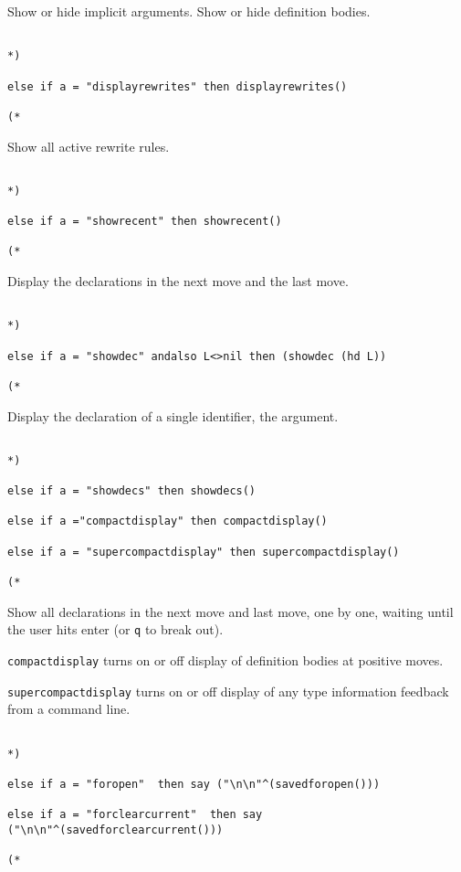 \documentclass{article}
\begin{document}
Show or hide implicit arguments.  Show or hide definition bodies.

\begin{verbatim}

*)

else if a = "displayrewrites" then displayrewrites()

(*

\end{verbatim}

Show all active rewrite rules.

\begin{verbatim}

*)

else if a = "showrecent" then showrecent()

(*

\end{verbatim}

Display the declarations in the next move and the last move.

\begin{verbatim}

*)

else if a = "showdec" andalso L<>nil then (showdec (hd L))

(*

\end{verbatim}

Display the declaration of a single identifier, the argument.

\begin{verbatim}

*)

else if a = "showdecs" then showdecs()

else if a ="compactdisplay" then compactdisplay()

else if a = "supercompactdisplay" then supercompactdisplay()

(*

\end{verbatim}

Show all declarations in the next move and last move, one by one, waiting until the user hits
enter (or {\tt q} to break out).

{\tt compactdisplay}  turns on or off display of definition bodies at positive moves.

{\tt supercompactdisplay} turns on or off display of any type information feedback from  a command line.

\begin{verbatim}

*)

else if a = "foropen"  then say ("\n\n"^(savedforopen()))

else if a = "forclearcurrent"  then say ("\n\n"^(savedforclearcurrent()))

(*

\end{verbatim}
\end{document}
